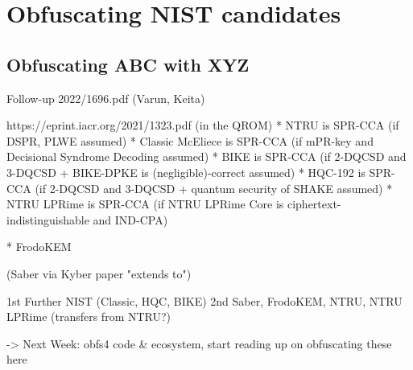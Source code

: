 \chapter{Obfuscating NIST candidates}\label{ch:results}

\section{Obfuscating ABC with XYZ} \label{sec:tbd}

Follow-up 2022/1696.pdf (Varun, Keita)

https://eprint.iacr.org/2021/1323.pdf (in the QROM)
* NTRU is SPR-CCA (if DSPR, PLWE assumed)
* Classic McEliece is SPR-CCA (if mPR-key and Decisional Syndrome Decoding assumed)
* BIKE is SPR-CCA (if 2-DQCSD and 3-DQCSD + BIKE-DPKE is (negligible)-correct assumed) 
* HQC-192 is SPR-CCA (if 2-DQCSD and 3-DQCSD + quantum security of SHAKE assumed) 
* NTRU LPRime is SPR-CCA (if NTRU LPRime Core is ciphertext-indistinguishable and IND-CPA)

* FrodoKEM 

(Saber via Kyber paper "extends to")

1st Further NIST (Classic, HQC, BIKE)
2nd Saber, FrodoKEM, NTRU, NTRU LPRime (transfers from NTRU?)

-> Next Week: obfs4 code \& ecosystem, start reading up on obfuscating these here